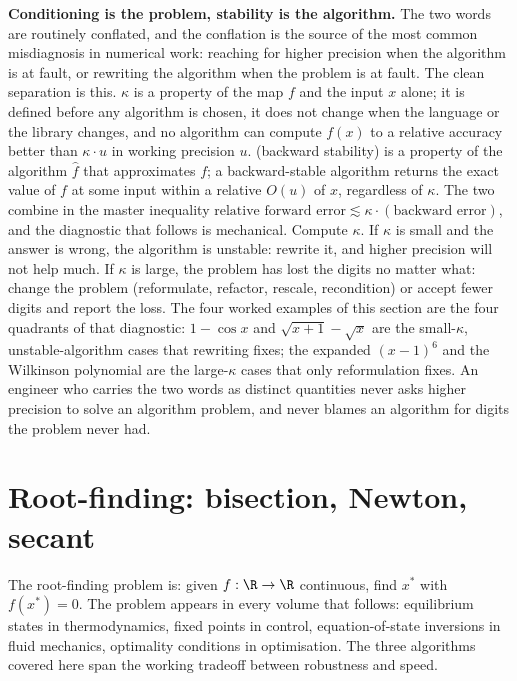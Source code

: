 \begin{mastery}
\textbf{Conditioning is the problem, stability is the algorithm.} The two
words are routinely conflated, and the conflation is the source of the most
common misdiagnosis in numerical work: reaching for higher precision when
the algorithm is at fault, or rewriting the algorithm when the problem is
at fault. The clean separation is this. 
$\kappa$ is a property of the map $f$ and the input $x$ alone; it is
defined before any algorithm is chosen, it does not change when the
language or the library changes, and no algorithm can compute $f(x)$ to a
relative accuracy better than $\kappa \cdot u$ in working precision $u$.
 (backward stability) is a property of the algorithm
$\hat{f}$ that approximates $f$; a backward-stable algorithm returns the
exact value of $f$ at some input within a relative $O(u)$ of $x$,
regardless of $\kappa$. The two combine in the master inequality
$\text{relative forward error} \lesssim \kappa \cdot (\text{backward
error})$, and the diagnostic that follows is mechanical. Compute $\kappa$.
If $\kappa$ is small and the answer is wrong, the algorithm is unstable:
rewrite it, and higher precision will not help much. If $\kappa$ is large,
the problem has lost the digits no matter what: change the problem
(reformulate, refactor, rescale, recondition) or accept fewer digits and
report the loss. The four worked examples of this section are the four
quadrants of that diagnostic: $1 - \cos x$ and $\sqrt{x+1} - \sqrt{x}$ are
the small-$\kappa$, unstable-algorithm cases that rewriting fixes; the
expanded $(x-1)^{6}$ and the Wilkinson polynomial are the large-$\kappa$
cases that only reformulation fixes. An engineer who carries the two words
as distinct quantities never asks higher precision to solve an algorithm
problem, and never blames an algorithm for digits the problem never had.
\end{mastery}

\section{Root-finding: bisection, Newton, secant}

The root-finding problem is: given $f: \R \to \R$ continuous,
find $x^{*}$ with $f(x^{*}) = 0$. The problem appears in every
volume that follows: equilibrium states in thermodynamics, fixed
points in control, equation-of-state inversions in fluid mechanics,
optimality conditions in optimisation. The three algorithms
covered here span the working tradeoff between robustness and
speed.

